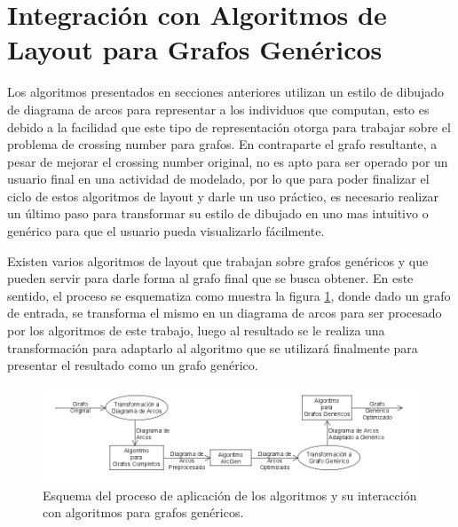 \section{Integración con Algoritmos de Layout para Grafos Genéricos}
\label{sec:integracion_generico}
Los algoritmos presentados en secciones anteriores utilizan un estilo de dibujado de diagrama de arcos para representar a los individuos que computan, esto es debido a la facilidad que este tipo de representación otorga para trabajar sobre el problema de crossing number para grafos. En contraparte el grafo resultante, a pesar de mejorar el crossing number original, no es apto para ser operado por un usuario final en una actividad de modelado, por lo que para poder finalizar el ciclo de estos algoritmos de layout y darle un uso práctico, es necesario realizar un último paso para transformar su estilo de dibujado en uno mas intuitivo o genérico para que el usuario pueda visualizarlo fácilmente.

Existen varios algoritmos de layout que trabajan sobre grafos genéricos y que pueden servir para darle forma al grafo final que se busca obtener. En este sentido, el proceso se esquematiza como muestra la figura \ref{fig:integracion_generico_diseno}, donde dado un grafo de entrada, se transforma el mismo en un diagrama de arcos para ser procesado por los algoritmos de este trabajo, luego al resultado se le realiza una transformación para adaptarlo al algoritmo que se utilizará finalmente para presentar el resultado como un grafo genérico.

\begin{figure}[H]
	\centering
	\includegraphics[width=16cm]{imagenes/integracion_generico_diseno.png}
	\caption{Esquema del proceso de aplicación de los algoritmos y su interacción con algoritmos para grafos genéricos.}
	\label{fig:integracion_generico_diseno}
\end{figure}

